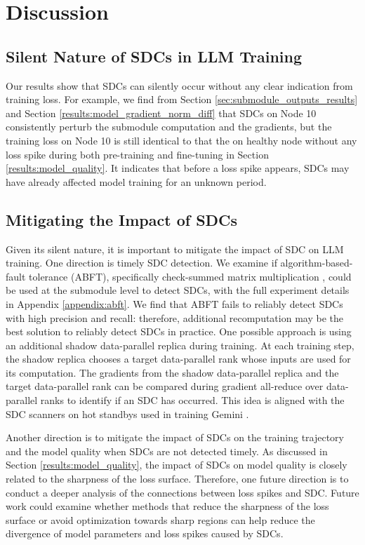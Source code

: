 \section{Discussion}

\subsection{Silent Nature of SDCs in LLM Training}

Our results show that SDCs can silently occur without any clear indication from training loss. For example, we find from Section \ref{sec:submodule_outputs_results} and Section \ref{results:model_gradient_norm_diff} that SDCs on Node 10 consistently perturb the submodule computation and the gradients, but the training loss on Node 10 is still identical to that the on healthy node without any loss spike during both pre-training and fine-tuning in Section \ref{results:model_quality}. It indicates that before a loss spike appears, SDCs may have already affected model training for an unknown period.


\subsection{Mitigating the Impact of SDCs}
Given its silent nature, it is important to mitigate the impact of SDC on LLM training. One direction is timely SDC detection. We examine if algorithm-based-fault tolerance (ABFT), specifically check-summed matrix multiplication \cite{utexas_abft}, could be used at the submodule level to detect SDCs, with the full experiment details in Appendix \ref{appendix:abft}.  We find that ABFT fails to reliably detect SDCs with high precision and recall: therefore, additional recomputation may be the best solution to reliably detect SDCs in practice. One possible approach is using an additional shadow data-parallel replica during training. At each training step, the shadow replica chooses a target data-parallel rank whose inputs are used for its computation. The gradients from the shadow data-parallel replica and the target data-parallel rank can be compared during gradient all-reduce over data-parallel ranks to identify if an SDC has occurred. This idea is aligned with the SDC scanners on hot standbys used in training Gemini \cite{geminiteam2024geminifamilyhighlycapable}. 

Another direction is to mitigate the impact of SDCs on the training trajectory and the model quality when SDCs are not detected timely. As discussed in Section \ref{results:model_quality}, the impact of SDCs on model quality is closely related to the sharpness of the loss surface. Therefore, one future direction is to conduct a deeper analysis of the connections between loss spikes and SDC. Future work could examine whether methods that reduce the sharpness of the loss surface or avoid optimization towards sharp regions \cite{lee2023explicitcurvatureregularizationdeep, bahri2022sharpnessawareminimizationimproveslanguage} can help reduce the divergence of model parameters and loss spikes caused by SDCs.




